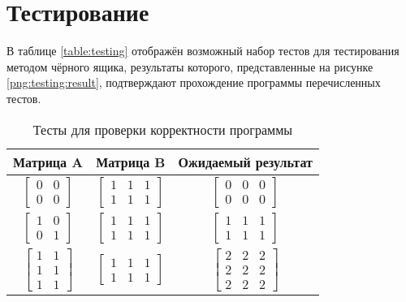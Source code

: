         
    \section{Тестирование}
        В таблице \ref{table:testing} отображён возможный набор тестов
        для тестирования методом чёрного ящика, результаты которого, 
        представленные на рисунке \ref{png:testing:result}, подтверждают
        прохождение программы перечисленных тестов.

        \begin{table}[]
            \caption{Тесты для проверки корректности программы}

            \centering
            \begin{tabular}{|c|c|c|}
                \hline
                Матрица A                                                & Матрица B                                              & Ожидаемый результат                                    \\ \hline
                $\begin{bmatrix} 0 & 0 \\ 0 & 0 \end{bmatrix}$           & $\begin{bmatrix} 1 & 1 & 1 \\ 1 & 1 & 1 \end{bmatrix}$ & $\begin{bmatrix} 0 & 0 & 0 \\ 0 & 0 & 0 \end{bmatrix}$ \\ \hline
                $\begin{bmatrix} 1 & 0 \\ 0 & 1 \end{bmatrix}$           & $\begin{bmatrix} 1 & 1 & 1 \\ 1 & 1 & 1 \end{bmatrix}$ & $\begin{bmatrix} 1 & 1 & 1 \\ 1 & 1 & 1 \end{bmatrix}$ \\ \hline
                $\begin{bmatrix} 1 & 1 \\ 1 & 1 \\ 1 & 1 \end{bmatrix}$  & $\begin{bmatrix} 1 & 1 & 1 \\ 1 & 1 & 1 \end{bmatrix}$ & $\begin{bmatrix} 2 & 2 & 2 \\ 2 & 2 & 2 \\ 2 & 2 & 2 \end{bmatrix}$ \\ \hline

\end{tabular}
\end{table}
